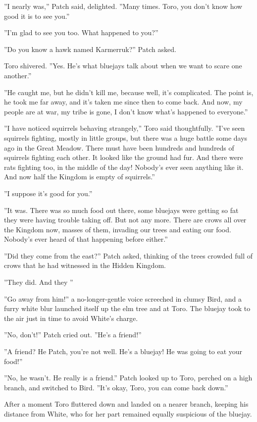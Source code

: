 \documentclass[12pt]{book}
\begin{document}
''I nearly was,'' Patch said, delighted. ''Many times. Toro, you don't know how good it is to see you.''

''I'm glad to see you too. What happened to you?''

''Do you know a hawk named Karmerruk?'' Patch asked.

Toro shivered. ''Yes. He's what bluejays talk about when we want to scare one another.''

''He caught me, but he didn't kill me, because %
well, it's complicated. The point is, he took me far away, and it's taken me since then to come back. And now, my people are at war, my tribe is gone, I don't know what's happened to everyone.''

''I have noticed squirrels behaving strangely,'' Toro said thoughtfully. ''I've seen squirrels fighting, mostly in little groups, but there was a huge battle some days ago in the Great Meadow. There must have been hundreds and hundreds of squirrels fighting each other. It looked like the ground had fur. And there were rats fighting too, in the middle of the day! Nobody's ever seen anything like it. And now half the Kingdom is empty of squirrels.''

''I suppose it's good for you.''

''It was. There was so much food out there, some bluejays were getting so fat they were having trouble taking off. But not any more. There are crows all over the Kingdom now, masses of them, invading our trees and eating our food. Nobody's ever heard of that happening before either.''

''Did they come from the east?'' Patch asked, thinking of the trees crowded full of crows that he had witnessed in the Hidden Kingdom.

''They did. And they %
''

''Go away from him!'' a no-longer-gentle voice screeched in clumsy Bird, and a furry white blur launched itself up the elm tree and at Toro. The bluejay took to the air just in time to avoid White's charge.

''No, don't!'' Patch cried out. ''He's a friend!''

''A friend? He %
Patch, you're not well. He's a bluejay! He was going to eat your food!''

''No, he wasn't. He really is a friend.'' Patch looked up to Toro, perched on a high branch, and switched to Bird. ''It's okay, Toro, you can come back down.''

After a moment Toro fluttered down and landed on a nearer branch, keeping his distance from White, who for her part remained equally suspicious of the bluejay.
\end{document}
